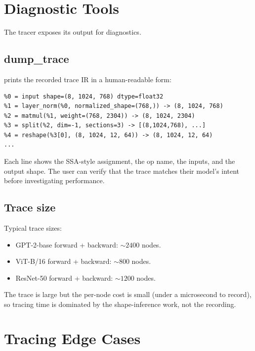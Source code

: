 \section{Diagnostic Tools}
\label{sec:tracer:diagnostics}

The tracer exposes its output for diagnostics.

\subsection{dump\_trace}
\label{ssec:tracer:dump_trace}

 prints the
recorded trace IR in a human-readable form:

\begin{verbatim}
%0 = input shape=(8, 1024, 768) dtype=float32
%1 = layer_norm(%0, normalized_shape=(768,)) -> (8, 1024, 768)
%2 = matmul(%1, weight=(768, 2304)) -> (8, 1024, 2304)
%3 = split(%2, dim=-1, sections=3) -> [(8,1024,768), ...]
%4 = reshape(%3[0], (8, 1024, 12, 64)) -> (8, 1024, 12, 64)
...
\end{verbatim}

Each line shows the SSA-style assignment, the op name, the
inputs, and the output shape. The user can verify that the trace
matches their model's intent before investigating performance.

\subsection{Trace size}
\label{ssec:tracer:trace_size}

Typical trace sizes:

\begin{itemize}
  \item GPT-2-base forward + backward: $\sim 2400$ nodes.
  \item ViT-B/16 forward + backward: $\sim 800$ nodes.
  \item ResNet-50 forward + backward: $\sim 1200$ nodes.
\end{itemize}

The trace is large but the per-node cost is small (under a
microsecond to record), so tracing time is dominated by the
shape-inference work, not the recording.

\section{Tracing Edge Cases}
\label{sec:tracer:edge_cases}

